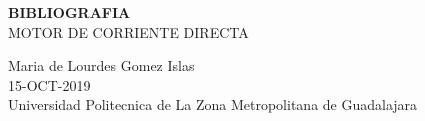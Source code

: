 \documentclass[11pt,a4paper]{article}
\begin{document}
\begin{center}
\textbf{BIBLIOGRAFIA}\\
MOTOR DE CORRIENTE DIRECTA
\end{center}

\begin{center}
Maria de Lourdes Gomez Islas\\
15-OCT-2019\\
Universidad Politecnica de La Zona Metropolitana de Guadalajara
\end{center}

\cite{viloria2014motores}


\end{document}

